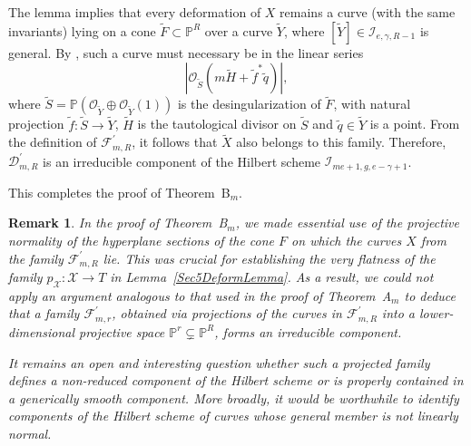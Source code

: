 \documentclass[a4paper,12pt]{amsart}
\newtheorem{remark}[thm]{Remark}
\begin{document}
The lemma implies that every deformation of $X$ remains a curve (with the same invariants) lying on a cone $\tilde{F} \subset \mathbb{P}^R$ over a curve $\tilde{Y}$, where $[\tilde{Y}] \in \mathcal{I}_{e, \gamma, R-1}$ is general. By \cite[Proposition~5]{CIK24b}, such a curve must necessary be in the linear series
\[
 |\mathcal{O}_{\tilde{S}} (m\tilde{H} + \tilde{f}^{\ast} \tilde{q})| ,
\]
where $\tilde{S} = \mathbb{P} (\mathcal{O}_{\tilde{Y}} \oplus \mathcal{O}_{\tilde{Y}} (1))$ is the desingularization of $\tilde{F}$, with natural projection $\tilde{f} : \tilde{S} \to \tilde{Y}$, $\tilde{H}$ is the tautological divisor on $\tilde{S}$ and $\tilde{q} \in \tilde{Y}$ is a point. From the definition of $\mathcal{F}^{\prime}_{m,R}$, it follows that $\tilde{X}$ also belongs to this family. Therefore, $\mathcal{D}^{\prime}_{m,R}$ is an irreducible  component of the Hilbert scheme $\mathcal{I}_{me+1, g, e-\gamma+1}$.

This completes the proof of \textnormal{Theorem~B$_m$}.

\medskip

\begin{remark}
In the proof of \textnormal{Theorem~B$_m$}, we made essential use of the projective normality of the hyperplane sections of the cone $F$ on which the curves $X$ from the family $\mathcal{F}^{\prime}_{m,R}$ lie. This was crucial for establishing the very flatness of the family $p_{\mathcal{X}} : \mathcal{X} \to T$ in \textnormal{Lemma~\ref{Sec5DeformLemma}}. As a result, we could not apply an argument analogous to that used in the proof of \textnormal{Theorem~A$_m$} to deduce that a family $\mathcal{F}^{\prime}_{m,r}$, obtained via projections of the curves in $\mathcal{F}^{\prime}_{m,R}$ into a lower-dimensional projective space $\mathbb{P}^r \subsetneq \mathbb{P}^R$, forms an irreducible component.

It remains an open and interesting question whether such a projected family defines a non-reduced component of the Hilbert scheme or is properly contained in a generically smooth component. More broadly, it would be worthwhile to identify components of the Hilbert scheme of curves whose general member is not linearly normal.
\end{remark}
\end{document}
